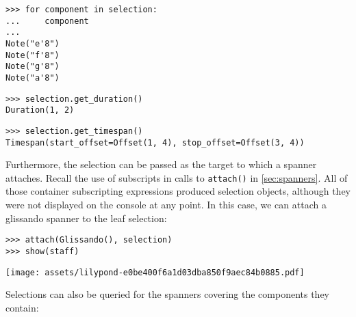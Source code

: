\begin{abjadbookoutput}
\begin{singlespacing}
\vspace{-0.5\baselineskip}
\begin{verbatim}
>>> for component in selection:
...     component
...
Note("e'8")
Note("f'8")
Note("g'8")
Note("a'8")
\end{verbatim}
\begin{verbatim}
>>> selection.get_duration()
Duration(1, 2)
\end{verbatim}
\begin{verbatim}
>>> selection.get_timespan()
Timespan(start_offset=Offset(1, 4), stop_offset=Offset(3, 4))
\end{verbatim}
\end{singlespacing}
\end{abjadbookoutput}

\noindent Furthermore, the selection can be passed as the target to which a
spanner attaches. Recall the use of subscripts in calls to \texttt{attach()} in
\autoref{sec:spanners}. All of those container subscripting expressions
produced selection objects, although they were not displayed on the console at
any point. In this case, we can attach a glissando spanner to the leaf
selection:

\begin{comment}
<abjad>
attach(Glissando(), selection)
show(staff)
</abjad>
\end{comment}

\begin{abjadbookoutput}
\begin{singlespacing}
\vspace{-0.5\baselineskip}
\begin{verbatim}
>>> attach(Glissando(), selection)
>>> show(staff)
\end{verbatim}
\noindent\texttt{[image: assets/lilypond-e0be400f6a1d03dba850f9aec84b0885.pdf]}
\end{singlespacing}
\end{abjadbookoutput}

\noindent Selections can also be queried for the spanners covering the
components they contain:

\begin{comment}
<abjad>
for spanner in selection.get_spanners():
    spanner

</abjad>
\end{comment}

